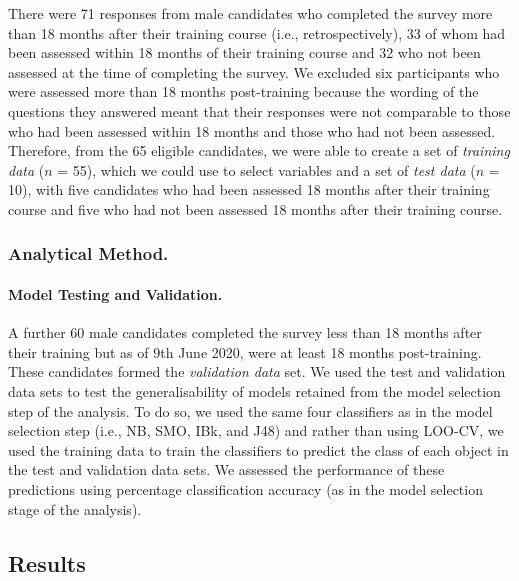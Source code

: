 \documentclass[
  12pt,
  a4paper,
]{book}
\begin{document}
There were 71 responses from male candidates who completed the survey more than 18 months after their training course (i.e., retrospectively), 33 of whom had been assessed within 18 months of their training course and 32 who not been assessed at the time of completing the survey. We excluded six participants who were assessed more than 18 months post-training because the wording of the questions they answered meant that their responses were not comparable to those who had been assessed within 18 months and those who had not been assessed. Therefore, from the 65 eligible candidates, we were able to create a set of \emph{training data} (\(n\) = 55), which we could use to select variables and a set of \emph{test data} (\(n\) = 10), with five candidates who had been assessed 18 months after their training course and five who had not been assessed 18 months after their training course.

\hypertarget{male-gta-analytical-method}{%
\subsubsection{Analytical Method.}\label{male-gta-analytical-method}}

\hypertarget{model-testing-and-validation.}{%
\paragraph{Model Testing and Validation.}\label{model-testing-and-validation.}}

A further 60 male candidates completed the survey less than 18 months after their training but as of 9th June 2020, were at least 18 months post-training. These candidates formed the \emph{validation data} set. We used the test and validation data sets to test the generalisability of models retained from the model selection step of the analysis. To do so, we used the same four classifiers as in the model selection step (i.e., NB, SMO, IBk, and J48) and rather than using LOO-CV, we used the training data to train the classifiers to predict the class of each object in the test and validation data sets. We assessed the performance of these predictions using percentage classification accuracy (as in the model selection stage of the analysis).

\hypertarget{male-gta-results}{%
\subsection{Results}\label{male-gta-results}}
\end{document}
